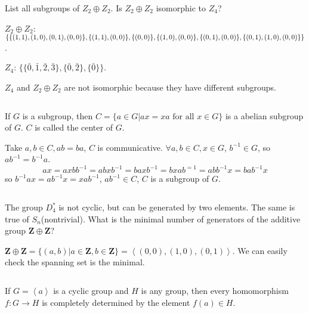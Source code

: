 $$ $$

\begin{ex}
    List all subgroups of $Z_2\oplus Z_2$. Is $Z_2\oplus Z_2$ isomorphic to $Z_4$?
\end{ex}

\begin{answer}
    $Z_2\oplus Z_2$: $\{\{(1,1),(1,0),(0,1),(0,0)\},\{(1,1),(0,0)\},\{(0,0)\},\\\{(1,0),(0,0)\},\{(0,1),(0,0)\},\{(0,1),(1,0),(0,0)\}\}$.

    $Z_4$: $\{\{\bar{0}, \bar{1}, \bar{2}, \bar{3}\}, \{\bar{0}, \bar{2}\}, \{\bar{0}\}\}$.

    $Z_4$ and $Z_2\oplus Z_2$ are not isomorphic because they have different subgroups.
\end{answer}

$$ $$

\begin{ex}
    If $G$ is a subgroup, then $C = \{a\in G| ax = xa \text{ for all } x\in G\}$ is a abelian subgroup of $G$. $C$ is called the center of $G$.
\end{ex}

\begin{answer}
    Take $a,b\in C, ab=ba$, $C$ is communicative. $\forall  a,b\in C, x\in G$, $b^{-1}\in G$, so $ab^{-1}=b^{-1}a$.\[ax=axbb^{-1}=abxb^{-1}=baxb^{-1}=bxab^{=1}=abb^{-1}x=bab^{-1}x\]so $b^{-1}ax=ab^{-1}x=xab^{-1}$, $ab^{-1}\in C$, $C$ is a subgroup of $G$.
\end{answer}

$$ $$

\begin{ex}
    The group $D_4^*$ is not cyclic, but can be generated by two elements. The same is true of $S_n$(nontrivial). What is the minimal number of generators of the additive group $\mathbf{Z}\oplus\mathbf{Z}$?
\end{ex}

\begin{answer}
    $\mathbf{Z}\oplus\mathbf{Z}=\{(a,b)|a\in \mathbf{Z}, b\in\mathbf{Z}\}=\left\langle(0,0), (1,0), (0,1)\right\rangle$. We can easily check the spanning set is the minimal.
\end{answer}

$$ $$

\begin{ex}
    If $G = \left\langle a \right\rangle $ is a cyclic group and $H$ is any group, then every homomorphism $f:G\to H$ is completely determined by the element $f(a)\in H$.
\end{ex}

